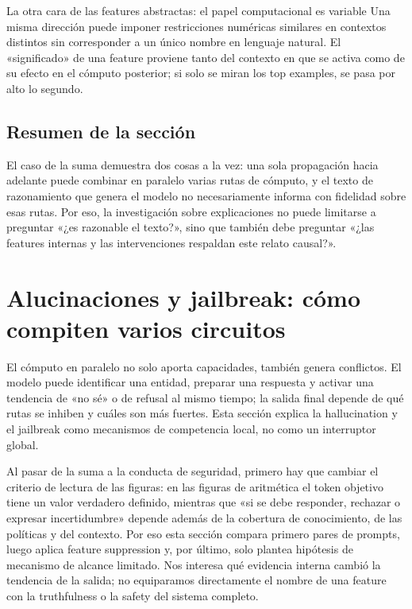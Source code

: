 \documentclass[a4paper]{article}
\begin{document}
\begin{knowledgebox}{La otra cara de las features abstractas: el papel computacional es variable}
Una misma dirección puede imponer restricciones numéricas similares en contextos distintos sin corresponder a un único nombre en lenguaje natural. El «significado» de una feature proviene tanto del contexto en que se activa como de su efecto en el cómputo posterior; si solo se miran los top examples, se pasa por alto lo segundo.
\end{knowledgebox}

\subsection{Resumen de la sección}

El caso de la suma demuestra dos cosas a la vez: una sola propagación hacia adelante puede combinar en paralelo varias rutas de cómputo, y el texto de razonamiento que genera el modelo no necesariamente informa con fidelidad sobre esas rutas. Por eso, la investigación sobre explicaciones no puede limitarse a preguntar «¿es razonable el texto?», sino que también debe preguntar «¿las features internas y las intervenciones respaldan este relato causal?».
\section{Alucinaciones y jailbreak: cómo compiten varios circuitos}

El cómputo en paralelo no solo aporta capacidades, también genera conflictos. El modelo puede identificar una entidad, preparar una respuesta y activar una tendencia de «no sé» o de refusal al mismo tiempo; la salida final depende de qué rutas se inhiben y cuáles son más fuertes. Esta sección explica la hallucination y el jailbreak como mecanismos de competencia local, no como un interruptor global.

Al pasar de la suma a la conducta de seguridad, primero hay que cambiar el criterio de lectura de las figuras: en las figuras de aritmética el token objetivo tiene un valor verdadero definido, mientras que «si se debe responder, rechazar o expresar incertidumbre» depende además de la cobertura de conocimiento, de las políticas y del contexto. Por eso esta sección compara primero pares de prompts, luego aplica feature suppression y, por último, solo plantea hipótesis de mecanismo de alcance limitado. Nos interesa qué evidencia interna cambió la tendencia de la salida; no equiparamos directamente el nombre de una feature con la truthfulness o la safety del sistema completo.
\end{document}
